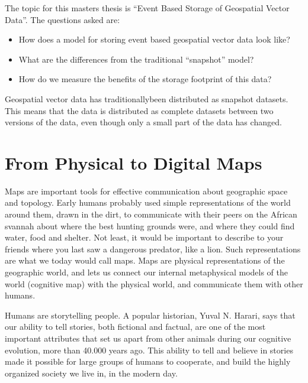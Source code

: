 The topic for this masters thesis is \enquote{Event Based Storage of Geospatial
Vector Data}. The questions asked are:

\begin{itemize}
\item How does a model for storing event based geospatial vector data look
  like?
\item What are the differences from the traditional \enquote{snapshot} model?
\item How do we measure the benefits of the storage footprint of this data?  
\end{itemize}
Geospatial vector data  has
traditionallybeen distributed as snapshot datasets. This means that the data
is distributed as complete datasets between two versions of the data, even
though only a small part of the data has changed.


\section{From Physical to Digital Maps}
Maps are important tools for effective communication about geographic space and
topology. Early humans probably used simple representations of the world around
them, drawn in the dirt, to communicate with their peers on the African svannah
about where the best hunting grounds were, and where they could find water, food
and shelter. Not least, it would be important to describe to your friends where
you last saw a dangerous predator, like a lion. Such representations are what we
today would call maps. Maps are physical representations of the
geographic world, and lets us connect our internal metaphysical
models of the world (cognitive map) with the physical world, and communicate
them with other humans.

Humans are storytelling people. A popular historian, Yuval N. Harari, says that
our ability to tell stories, both fictional and factual, are one of the most
important attributes that set us apart from other animals during our cognitive
evolution, more than  40.000 years ago. This ability to tell and
believe in stories made it possible for large groups of humans to cooperate, and
build the highly organized society we live in, in the modern day.


